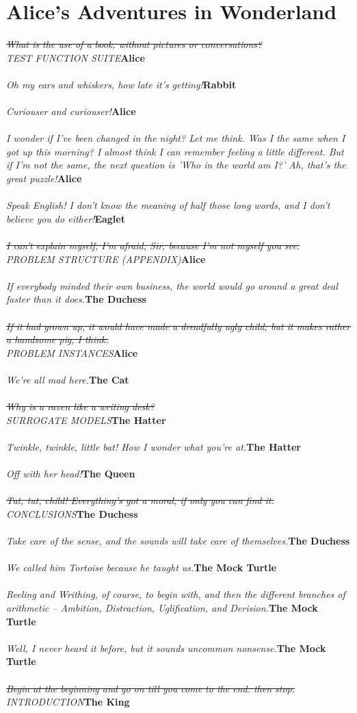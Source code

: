 \documentclass{hi-thesis}
\renewcommand{\quote}[2]{\noindent \emph{#2}\hfill{\bf #1}\\\\}
\begin{document}
\pagestyle{plain} 


\chapter*{Alice's Adventures in Wonderland}

\quote{Alice}{\st{What is the use of a book, without pictures or conversations?}\\TEST FUNCTION SUITE} 
\quote{Rabbit}{Oh my ears and whiskers, how late it's getting!}
\quote{Alice}{Curiouser and curiouser!}
\quote{Alice}{I wonder if I've been changed in the night? Let me think. Was I the same when I got up this morning? I almost think I can remember feeling a little different. But if I'm not the same, the next question is 'Who in the world am I?' Ah, that's the great puzzle!}
\quote{Eaglet}{Speak English! I don't know the meaning of half those long words, and I don't believe you do either!}
\quote{Alice}{\st{I can't explain myself, I'm afraid, Sir, because I'm not myself you see.}\\PROBLEM STRUCTURE (APPENDIX)}
\quote{The Duchess}{If everybody minded their own business, the world would go around a great deal faster than it does.}
\quote{Alice}{\st{If it had grown up, it would have made a dreadfully ugly child; but it makes rather a handsome pig, I think.}\\PROBLEM INSTANCES}
\quote{The Cat}{We're all mad here.}
\quote{The Hatter}{ \st{Why is a raven like a writing desk?}\\SURROGATE MODELS}
\quote{The Hatter}{Twinkle, twinkle, little bat! How I wonder what you're at.}
\quote{The Queen}{Off with her head!}
\quote{The Duchess}{\st{Tut, tut, child! Everything's got a moral, if only you can find it.}\\CONCLUSIONS}
\quote{The Duchess}{Take care of the sense, and the sounds will take care of themselves.}
\quote{The Mock Turtle}{We called him Tortoise because he taught us.}
\quote{The Mock Turtle}{Reeling and Writhing, of course, to begin with, and then the different branches of arithmetic -- Ambition, Distraction, Uglification, and Derision.}
\quote{The Mock Turtle}{Well, I never heard it before, but it sounds uncommon nonsense.}
\quote{The King}{\st{Begin at the beginning and go on till you come to the end: then stop.} \\INTRODUCTION}
\end{document}
